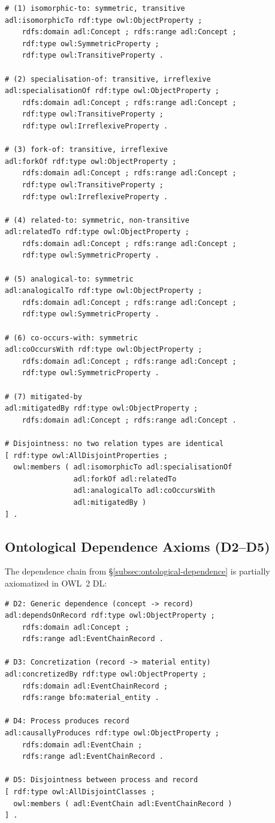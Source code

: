 \begin{verbatim}
# (1) isomorphic-to: symmetric, transitive
adl:isomorphicTo rdf:type owl:ObjectProperty ;
    rdfs:domain adl:Concept ; rdfs:range adl:Concept ;
    rdf:type owl:SymmetricProperty ;
    rdf:type owl:TransitiveProperty .

# (2) specialisation-of: transitive, irreflexive
adl:specialisationOf rdf:type owl:ObjectProperty ;
    rdfs:domain adl:Concept ; rdfs:range adl:Concept ;
    rdf:type owl:TransitiveProperty ;
    rdf:type owl:IrreflexiveProperty .

# (3) fork-of: transitive, irreflexive
adl:forkOf rdf:type owl:ObjectProperty ;
    rdfs:domain adl:Concept ; rdfs:range adl:Concept ;
    rdf:type owl:TransitiveProperty ;
    rdf:type owl:IrreflexiveProperty .

# (4) related-to: symmetric, non-transitive
adl:relatedTo rdf:type owl:ObjectProperty ;
    rdfs:domain adl:Concept ; rdfs:range adl:Concept ;
    rdf:type owl:SymmetricProperty .

# (5) analogical-to: symmetric
adl:analogicalTo rdf:type owl:ObjectProperty ;
    rdfs:domain adl:Concept ; rdfs:range adl:Concept ;
    rdf:type owl:SymmetricProperty .

# (6) co-occurs-with: symmetric
adl:coOccursWith rdf:type owl:ObjectProperty ;
    rdfs:domain adl:Concept ; rdfs:range adl:Concept ;
    rdf:type owl:SymmetricProperty .

# (7) mitigated-by
adl:mitigatedBy rdf:type owl:ObjectProperty ;
    rdfs:domain adl:Concept ; rdfs:range adl:Concept .

# Disjointness: no two relation types are identical
[ rdf:type owl:AllDisjointProperties ;
  owl:members ( adl:isomorphicTo adl:specialisationOf
                adl:forkOf adl:relatedTo
                adl:analogicalTo adl:coOccursWith
                adl:mitigatedBy )
] .
\end{verbatim}

\subsection{Ontological Dependence Axioms (D2--D5)}

The dependence chain from \S\ref{subsec:ontological-dependence} is partially axiomatized in OWL~2 DL:
\begin{verbatim}
# D2: Generic dependence (concept -> record)
adl:dependsOnRecord rdf:type owl:ObjectProperty ;
    rdfs:domain adl:Concept ;
    rdfs:range adl:EventChainRecord .

# D3: Concretization (record -> material entity)
adl:concretizedBy rdf:type owl:ObjectProperty ;
    rdfs:domain adl:EventChainRecord ;
    rdfs:range bfo:material_entity .

# D4: Process produces record
adl:causallyProduces rdf:type owl:ObjectProperty ;
    rdfs:domain adl:EventChain ;
    rdfs:range adl:EventChainRecord .

# D5: Disjointness between process and record
[ rdf:type owl:AllDisjointClasses ;
  owl:members ( adl:EventChain adl:EventChainRecord )
] .
\end{verbatim}

